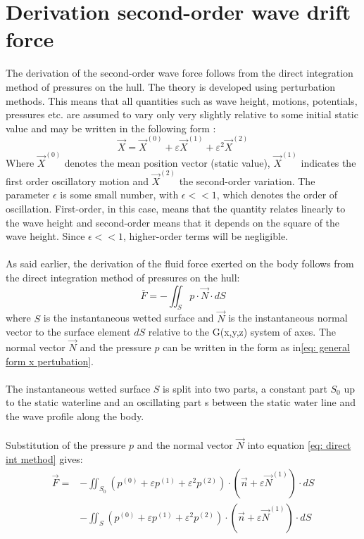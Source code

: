 \section{Derivation second-order wave drift force}


The derivation of the second-order wave force follows from the direct integration method of pressures on the hull. The theory is developed using perturbation methods. This means that all quantities such as wave height, motions, potentials, pressures etc. are assumed to vary only very slightly relative to some initial static value and may be written in the following form \parencite{journee2000offshore}:
\begin{equation}
    \vec{X}=\vec{X}^{(0)}+\varepsilon \vec{X}^{(1)}+\varepsilon^{2} \vec{X}^{(2)}
    \label{eq: general form x pertubation}
\end{equation}
Where $\vec{X}^{(0)}$ denotes the mean position vector (static value), $\vec{X}^{(1)}$ indicates the first order oscillatory motion and $\vec{X}^{(2)}$ the second-order variation. The parameter $\epsilon$ is some small number, with $\epsilon<<1$, which denotes the order of oscillation. First-order, in this case, means that the quantity relates linearly to the wave height and second-order means that it depends on the square of the wave height. Since $\epsilon<<1$, higher-order terms will be negligible. \\
\\
As said earlier, the derivation of the fluid force exerted on the body follows from the direct integration method of pressures on the hull:
\begin{equation}
\bar{F}=-\iint_{S} p \cdot \vec{N} \cdot d S
\label{eq: direct int method}
\end{equation}
where $S$ is the instantaneous wetted surface and $\vec{N}$ is the instantaneous normal vector to the surface element $dS$ relative to the G(x,y,z) system of axes. The normal vector $\vec{N}$ and the pressure $p$ can be written in the form as in\ref{eq: general form x pertubation}. \\
\\
The instantaneous wetted surface $S$ is split into two parts, a constant part $S_0$ up to the static waterline and an oscillating part s between the static water line and the wave profile along the body. \\
\\
Substitution of the pressure $p$ and the normal vector $\vec{N}$ into equation \ref{eq: direct int method} gives:
\begin{equation}
\begin{aligned}
\vec{F}=&-\iint_{S_{0}}\left(p^{(0)}+\varepsilon p^{(1)}+\varepsilon^{2} p^{(2)}\right) \cdot\left(\vec{n}+\varepsilon \vec{N}^{(1)}\right) \cdot d S \\
&-\iint_{S}\left(p^{(0)}+\varepsilon p^{(1)}+\varepsilon^{2} p^{(2)}\right) \cdot\left(\vec{n}+\varepsilon \vec{N}^{(1)}\right) \cdot d S
\end{aligned}
\label{eq: total drift force}
\end{equation}
